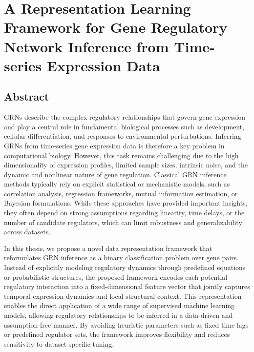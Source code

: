 
\chapter{A Representation Learning Framework for Gene Regulatory Network Inference from Time-series Expression Data} %

\label{Chapter3} %




\section{Abstract}
GRNs describe the complex regulatory relationships that govern gene expression and play a central role in fundamental biological processes such as development, cellular differentiation, and responses to environmental perturbations. Inferring GRNs from time-series gene expression data is therefore a key problem in computational biology. However, this task remains challenging due to the high dimensionality of expression profiles, limited sample sizes, intrinsic noise, and the dynamic and nonlinear nature of gene regulation. Classical GRN inference methods typically rely on explicit statistical or mechanistic models, such as correlation analysis, regression frameworks, mutual information estimation, or Bayesian formulations. While these approaches have provided important insights, they often depend on strong assumptions regarding linearity, time delays, or the number of candidate regulators, which can limit robustness and generalizability across datasets.

In this thesis, we propose a novel data representation framework that reformulates GRN inference as a binary classification problem over gene pairs. Instead of explicitly modeling regulatory dynamics through predefined equations or probabilistic structures, the proposed framework encodes each potential regulatory interaction into a fixed-dimensional feature vector that jointly captures temporal expression dynamics and local structural context. This representation enables the direct application of a wide range of supervised machine learning models, allowing regulatory relationships to be inferred in a data-driven and assumption-free manner. By avoiding heuristic parameters such as fixed time lags or predefined regulator sets, the framework improves flexibility and reduces sensitivity to dataset-specific tuning.

